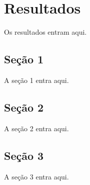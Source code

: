 \chapter{Resultados}
Os resultados entram aqui.

\section{Seção 1}
A seção 1 entra aqui.

\section{Seção 2}
A seção 2 entra aqui.

\section{Seção 3}
A seção 3 entra aqui.